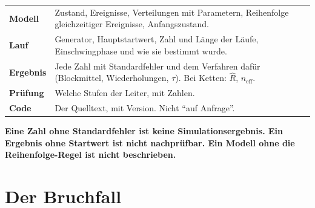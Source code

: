 \begin{merksatz}
\begin{center}
{\small
\renewcommand{\arraystretch}{1.5}
\begin{tabular}{@{}P{2.6cm}P{6.2cm}@{}}
\toprule
\textbf{Modell} & Zustand, Ereignisse, Verteilungen mit Parametern, Reihenfolge gleichzeitiger Ereignisse, Anfangszustand.\\
\textbf{Lauf} & Generator, Hauptstartwert, Zahl und Länge der Läufe, Einschwingphase und wie sie bestimmt wurde.\\
\textbf{Ergebnis} & Jede Zahl mit Standardfehler und dem Verfahren dafür (Blockmittel, Wiederholungen, $\tau$). Bei Ketten: $\hat R$, $n_{\text{eff}}$.\\
\textbf{Prüfung} & Welche Stufen der Leiter, mit Zahlen.\\
\textbf{Code} & Der Quelltext, mit Version. Nicht \enquote{auf Anfrage}.\\
\bottomrule
\end{tabular}}
\end{center}

\begin{center}
\begin{minipage}{0.9\textwidth}
\textbf{Eine Zahl ohne Standardfehler ist keine Simulationsergebnis. Ein Ergebnis ohne Startwert ist nicht nachprüfbar. Ein Modell ohne die Reihenfolge-Regel ist nicht beschrieben.}
\end{minipage}
\end{center}

\begin{center}
\begin{minipage}{0.88\textwidth}
\end{minipage}
\end{center}
\end{merksatz}

\section{Der Bruchfall}

